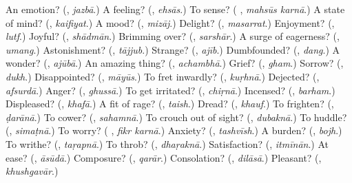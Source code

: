 \begin{tcolorbox}[breakable,colback=teal!4,colframe=teal!35!black,title={Before you move on}]
An emotion? (\textbf{}, \emph{jazbā}.) A feeling? (\textbf{}, \emph{ehsās}.) To sense? (\textbf{ }, \emph{mahsūs karnā}.) A state of mind? (\textbf{}, \emph{kaifiyat}.) A mood? (\textbf{}, \emph{mizāj}.) Delight? (\textbf{}, \emph{masarrat}.) Enjoyment? (\textbf{}, \emph{lutf}.) Joyful? (\textbf{}, \emph{shādmān}.) Brimming over? (\textbf{}, \emph{sarshār}.) A surge of eagerness? (\textbf{}, \emph{umang}.) Astonishment? (\textbf{}, \emph{tājjub}.) Strange? (\textbf{}, \emph{ajīb}.) Dumbfounded? (\textbf{}, \emph{dang}.) A wonder? (\textbf{}, \emph{ajūbā}.) An amazing thing? (\textbf{}, \emph{achambhā}.) Grief? (\textbf{}, \emph{gham}.) Sorrow? (\textbf{}, \emph{dukh}.) Disappointed? (\textbf{}, \emph{māyūs}.) To fret inwardly? (\textbf{}, \emph{kuṛhnā}.) Dejected? (\textbf{}, \emph{afsurdā}.) Anger? (\textbf{}, \emph{ghussā}.) To get irritated? (\textbf{}, \emph{chiṛnā}.) Incensed? (\textbf{}, \emph{barham}.) Displeased? (\textbf{}, \emph{khafā}.) A fit of rage? (\textbf{}, \emph{taish}.) Dread? (\textbf{}, \emph{khauf}.) To frighten? (\textbf{}, \emph{ḍarānā}.) To cower? (\textbf{}, \emph{sahamnā}.) To crouch out of sight? (\textbf{}, \emph{dubaknā}.) To huddle? (\textbf{}, \emph{simaṭnā}.) To worry? (\textbf{ }, \emph{fikr karnā}.) Anxiety? (\textbf{}, \emph{tashvīsh}.) A burden? (\textbf{}, \emph{bojh}.) To writhe? (\textbf{}, \emph{taṛapnā}.) To throb? (\textbf{}, \emph{dhaṛaknā}.) Satisfaction? (\textbf{}, \emph{itmīnān}.) At ease? (\textbf{}, \emph{āsūdā}.) Composure? (\textbf{}, \emph{qarār}.) Consolation? (\textbf{}, \emph{dilāsā}.) Pleasant? (\textbf{}, \emph{khushgavār}.)
\end{tcolorbox}

